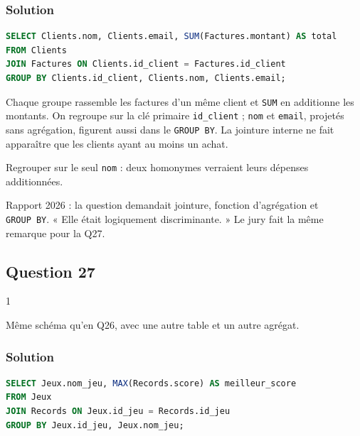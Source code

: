 \documentclass[11pt,a4paper]{article}
\begin{document}
\hypertarget{solution-25}{%
\subsubsection{Solution}\label{solution-25}}

\begin{lstlisting}[language=SQL]
SELECT Clients.nom, Clients.email, SUM(Factures.montant) AS total
FROM Clients
JOIN Factures ON Clients.id_client = Factures.id_client
GROUP BY Clients.id_client, Clients.nom, Clients.email;
\end{lstlisting}

Chaque groupe rassemble les factures d'un même client et \texttt{SUM} en additionne les montants. On regroupe sur la clé primaire \texttt{id\_client} ; \texttt{nom} et \texttt{email}, projetés sans agrégation, figurent aussi dans le \texttt{GROUP\ BY}. La jointure interne ne fait apparaître que les clients ayant au moins un achat.

\begin{piege}

Regrouper sur le seul \texttt{nom} : deux homonymes verraient leurs dépenses additionnées.

\end{piege}

\begin{jury}

Rapport 2026 : la question demandait jointure, fonction d'agrégation et \texttt{GROUP\ BY}. « Elle était logiquement discriminante. » Le jury fait la même remarque pour la Q27.

\end{jury}

\hypertarget{question-27}{%
\subsection{Question 27}\label{question-27}}

\begin{indication}{1}

Même schéma qu'en Q26, avec une autre table et un autre agrégat.

\end{indication}

\hypertarget{solution-26}{%
\subsubsection{Solution}\label{solution-26}}

\begin{lstlisting}[language=SQL]
SELECT Jeux.nom_jeu, MAX(Records.score) AS meilleur_score
FROM Jeux
JOIN Records ON Jeux.id_jeu = Records.id_jeu
GROUP BY Jeux.id_jeu, Jeux.nom_jeu;
\end{lstlisting}
\end{document}
